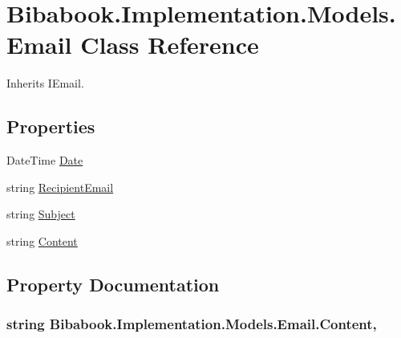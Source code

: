 \hypertarget{class_bibabook_1_1_implementation_1_1_models_1_1_email}{}\section{Bibabook.\+Implementation.\+Models.\+Email Class Reference}
\label{class_bibabook_1_1_implementation_1_1_models_1_1_email}


Inherits I\+Email.

\subsection*{Properties}
\begin{DoxyCompactItemize}
\item 
Date\+Time \hyperlink{class_bibabook_1_1_implementation_1_1_models_1_1_email_a84d1820e0a0ae9fce66e15df4546cf46}{Date}
\item 
string \hyperlink{class_bibabook_1_1_implementation_1_1_models_1_1_email_a1a8b55a0fa33dd44b9496e379858263d}{Recipient\+Email}
\item 
string \hyperlink{class_bibabook_1_1_implementation_1_1_models_1_1_email_addc43ff83003a1972d568fdac29f89bd}{Subject}
\item 
string \hyperlink{class_bibabook_1_1_implementation_1_1_models_1_1_email_a7810886176c92c1f9ff384640fead18e}{Content}
\end{DoxyCompactItemize}


\subsection{Property Documentation}
\hypertarget{class_bibabook_1_1_implementation_1_1_models_1_1_email_a7810886176c92c1f9ff384640fead18e}{}
\subsubsection[{Content}]{\setlength{\rightskip}{0pt plus 5cm}string Bibabook.\+Implementation.\+Models.\+Email.\+Content\hspace{0.3cm}{\ttfamily [get]}, {\ttfamily [set]}}\label{class_bibabook_1_1_implementation_1_1_models_1_1_email_a7810886176c92c1f9ff384640fead18e}
\hypertarget{class_bibabook_1_1_implementation_1_1_models_1_1_email_a84d1820e0a0ae9fce66e15df4546cf46}{}
